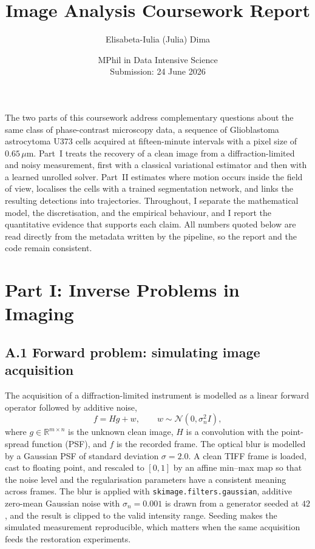 \documentclass[11pt,a4paper]{article}
\title{\vspace{-1.2cm}Image Analysis Coursework Report}
\author{Elisabeta-Iulia (Julia) Dima}
\date{MPhil in Data Intensive Science \\ Submission: 24 June 2026}
\begin{document}
\maketitle
\vspace{-0.6cm}

\noindent
The two parts of this coursework address complementary questions about the
same class of phase-contrast microscopy data, a sequence of Glioblastoma
astrocytoma U373 cells acquired at fifteen-minute intervals with a pixel size
of \(0.65\,\mu\)m. Part~I treats the recovery of a clean image from a
diffraction-limited and noisy measurement, first with a classical variational
estimator and then with a learned unrolled solver. Part~II estimates where
motion occurs inside the field of view, localises the cells with a trained
segmentation network, and links the resulting detections into trajectories.
Throughout, I separate the mathematical model, the discretisation, and the
empirical behaviour, and I report the quantitative evidence that supports each
claim. All numbers quoted below are read directly from the metadata written by
the pipeline, so the report and the code remain consistent.

\section{Part I: Inverse Problems in Imaging}

\subsection{A.1 Forward problem: simulating image acquisition}

The acquisition of a diffraction-limited instrument is modelled as a linear
forward operator followed by additive noise,
\begin{equation}
  f = Hg + w, \qquad w \sim \mathcal{N}(0,\sigma_n^2 I),
\end{equation}
where \(g\in\mathbb{R}^{m\times n}\) is the unknown clean image, \(H\) is a
convolution with the point-spread function (PSF), and \(f\) is the recorded
frame. The optical blur is modelled by a Gaussian PSF of standard deviation
\(\sigma=2.0\). A clean TIFF frame is loaded, cast to floating point, and
rescaled to \([0,1]\) by an affine min--max map so that the noise level and the
regularisation parameters have a consistent meaning across frames. The blur is
applied with \texttt{skimage.filters.gaussian}, additive zero-mean Gaussian
noise with \(\sigma_n=0.001\) is drawn from a generator seeded at \(42\), and
the result is clipped to the valid intensity range. Seeding makes the simulated
measurement reproducible, which matters when the same acquisition feeds the
restoration experiments.
\end{document}
